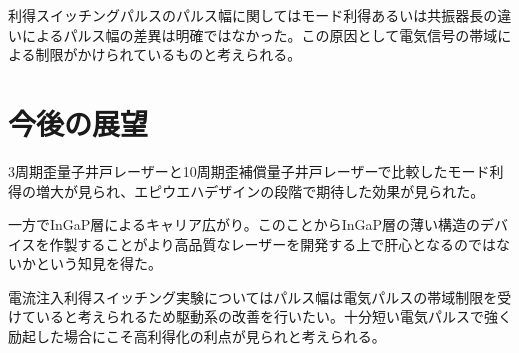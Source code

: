 利得スイッチングパルスのパルス幅に関してはモード利得あるいは共振器長の違いによるパルス幅の差異は明確ではなかった。この原因として電気信号の帯域による制限がかけられているものと考えられる。

\section{今後の展望}
3周期歪量子井戸レーザーと10周期歪補償量子井戸レーザーで比較したモード利得の増大が見られ、エピウエハデザインの段階で期待した効果が見られた。

一方でInGaP層によるキャリア広がり。このことからInGaP層の薄い構造のデバイスを作製することがより高品質なレーザーを開発する上で肝心となるのではないかという知見を得た。


電流注入利得スイッチング実験についてはパルス幅は電気パルスの帯域制限を受けていると考えられるため駆動系の改善を行いたい。十分短い電気パルスで強く励起した場合にこそ高利得化の利点が見られと考えられる。